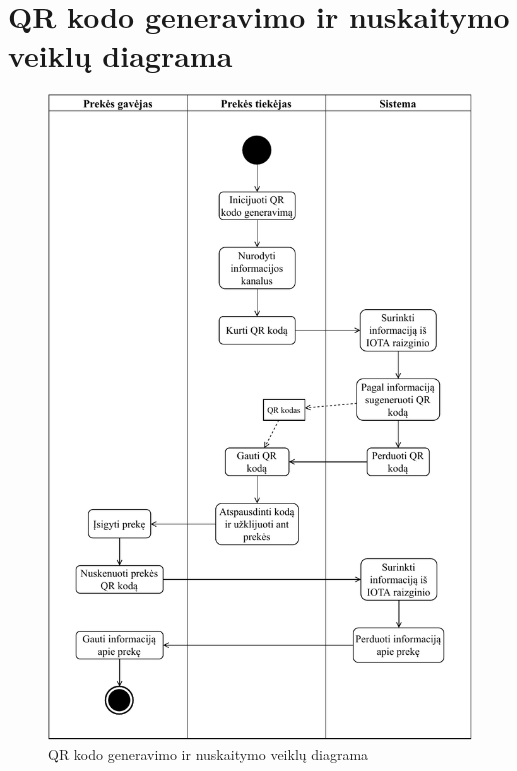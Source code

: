 \section{QR kodo generavimo ir nuskaitymo veiklų diagrama} \label{appendix:7}
\begin{figure}[H]
    \centering
    \includegraphics[scale=0.9]{images/ad-4}
    \caption{QR kodo generavimo ir nuskaitymo veiklų diagrama}
\end{figure}

